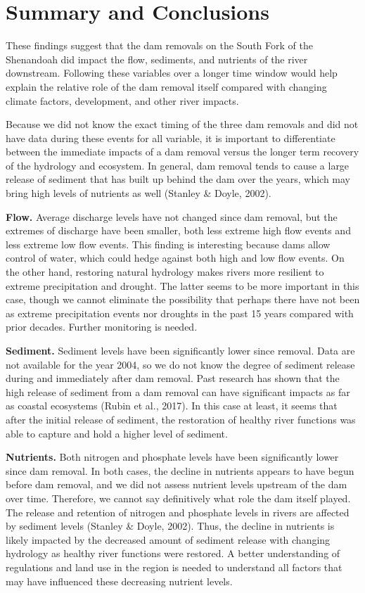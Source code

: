 \documentclass[
  12pt,
]{article}
\begin{document}
\hypertarget{summary-and-conclusions}{%
\section{Summary and Conclusions}\label{summary-and-conclusions}}

These findings suggest that the dam removals on the South Fork of the
Shenandoah did impact the flow, sediments, and nutrients of the river
downstream. Following these variables over a longer time window would
help explain the relative role of the dam removal itself compared with
changing climate factors, development, and other river impacts.

Because we did not know the exact timing of the three dam removals and
did not have data during these events for all variable, it is important
to differentiate between the immediate impacts of a dam removal versus
the longer term recovery of the hydrology and ecosystem. In general, dam
removal tends to cause a large release of sediment that has built up
behind the dam over the years, which may bring high levels of nutrients
as well (Stanley \& Doyle, 2002).

\textbf{Flow.} Average discharge levels have not changed since dam
removal, but the extremes of discharge have been smaller, both less
extreme high flow events and less extreme low flow events. This finding
is interesting because dams allow control of water, which could hedge
against both high and low flow events. On the other hand, restoring
natural hydrology makes rivers more resilient to extreme precipitation
and drought. The latter seems to be more important in this case, though
we cannot eliminate the possibility that perhaps there have not been as
extreme precipitation events nor droughts in the past 15 years compared
with prior decades. Further monitoring is needed.

\textbf{Sediment.} Sediment levels have been significantly lower since
removal. Data are not available for the year 2004, so we do not know the
degree of sediment release during and immediately after dam removal.
Past research has shown that the high release of sediment from a dam
removal can have significant impacts as far as coastal ecosystems (Rubin
et al., 2017). In this case at least, it seems that after the initial
release of sediment, the restoration of healthy river functions was able
to capture and hold a higher level of sediment.

\textbf{Nutrients.} Both nitrogen and phosphate levels have been
significantly lower since dam removal. In both cases, the decline in
nutrients appears to have begun before dam removal, and we did not
assess nutrient levels upstream of the dam over time. Therefore, we
cannot say definitively what role the dam itself played. The release and
retention of nitrogen and phosphate levels in rivers are affected by
sediment levels (Stanley \& Doyle, 2002). Thus, the decline in nutrients
is likely impacted by the decreased amount of sediment release with
changing hydrology as healthy river functions were restored. A better
understanding of regulations and land use in the region is needed to
understand all factors that may have influenced these decreasing
nutrient levels.
\end{document}
